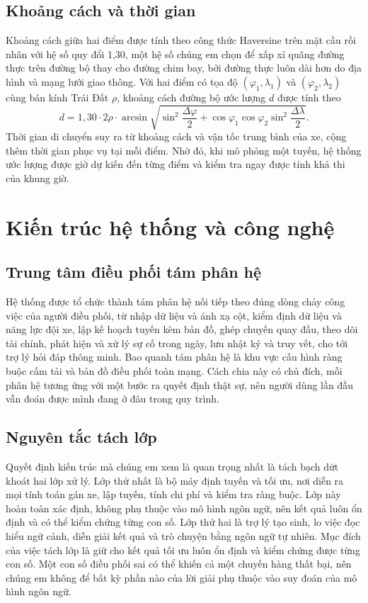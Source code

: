 \documentclass[12pt,a4paper,oneside]{report}
\begin{document}
\section{Khoảng cách và thời gian}
Khoảng cách giữa hai điểm được tính theo công thức Haversine trên mặt cầu rồi nhân với hệ số quy đổi 1,30, một hệ số chúng em chọn để xấp xỉ quãng đường thực trên đường bộ thay cho đường chim bay, bởi đường thực luôn dài hơn do địa hình và mạng lưới giao thông. Với hai điểm có tọa độ $(\varphi_1,\lambda_1)$ và $(\varphi_2,\lambda_2)$ cùng bán kính Trái Đất $\rho$, khoảng cách đường bộ ước lượng $d$ được tính theo
\begin{equation}
d = 1{,}30 \cdot 2\rho \cdot \arcsin\!\sqrt{\sin^2\!\frac{\Delta\varphi}{2} + \cos\varphi_1\cos\varphi_2\sin^2\!\frac{\Delta\lambda}{2}}.
\end{equation}
Thời gian di chuyển suy ra từ khoảng cách và vận tốc trung bình của xe, cộng thêm thời gian phục vụ tại mỗi điểm. Nhờ đó, khi mô phỏng một tuyến, hệ thống ước lượng được giờ dự kiến đến từng điểm và kiểm tra ngay được tính khả thi của khung giờ.

\chapter{Kiến trúc hệ thống và công nghệ}

\section{Trung tâm điều phối tám phân hệ}
Hệ thống được tổ chức thành tám phân hệ nối tiếp theo đúng dòng chảy công việc của người điều phối, từ nhập dữ liệu và ánh xạ cột, kiểm định dữ liệu và năng lực đội xe, lập kế hoạch tuyến kèm bản đồ, ghép chuyến quay đầu, theo dõi tài chính, phát hiện và xử lý sự cố trong ngày, lưu nhật ký và truy vết, cho tới trợ lý hỏi đáp thông minh. Bao quanh tám phân hệ là khu vực cấu hình ràng buộc cấm tải và bản đồ điều phối toàn mạng. Cách chia này có chủ đích, mỗi phân hệ tương ứng với một bước ra quyết định thật sự, nên người dùng lần đầu vẫn đoán được mình đang ở đâu trong quy trình.

\section{Nguyên tắc tách lớp}
Quyết định kiến trúc mà chúng em xem là quan trọng nhất là tách bạch dứt khoát hai lớp xử lý. Lớp thứ nhất là bộ máy định tuyến và tối ưu, nơi diễn ra mọi tính toán gán xe, lập tuyến, tính chi phí và kiểm tra ràng buộc. Lớp này hoàn toàn xác định, không phụ thuộc vào mô hình ngôn ngữ, nên kết quả luôn ổn định và có thể kiểm chứng từng con số. Lớp thứ hai là trợ lý tạo sinh, lo việc đọc hiểu ngữ cảnh, diễn giải kết quả và trò chuyện bằng ngôn ngữ tự nhiên. Mục đích của việc tách lớp là giữ cho kết quả tối ưu luôn ổn định và kiểm chứng được từng con số. Một con số điều phối sai có thể khiến cả một chuyến hàng thất bại, nên chúng em không để bất kỳ phần nào của lời giải phụ thuộc vào suy đoán của mô hình ngôn ngữ.
\end{document}
